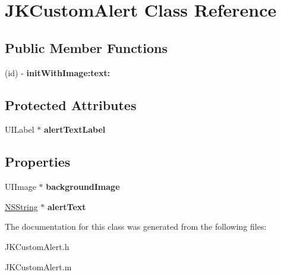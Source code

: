 \hypertarget{interface_j_k_custom_alert}{
\section{\-J\-K\-Custom\-Alert \-Class \-Reference}
\label{interface_j_k_custom_alert}
}
\subsection*{\-Public \-Member \-Functions}
\begin{DoxyCompactItemize}
\item 
\hypertarget{interface_j_k_custom_alert_a423fee7be575eb859c5f60d6b35910f8}{
(id) -\/ {\bfseries init\-With\-Image\-:text\-:}}
\label{interface_j_k_custom_alert_a423fee7be575eb859c5f60d6b35910f8}

\end{DoxyCompactItemize}
\subsection*{\-Protected \-Attributes}
\begin{DoxyCompactItemize}
\item 
\hypertarget{interface_j_k_custom_alert_abc171bdf8a320a5c17875d3e1f452adc}{
\-U\-I\-Label $\ast$ {\bfseries alert\-Text\-Label}}
\label{interface_j_k_custom_alert_abc171bdf8a320a5c17875d3e1f452adc}

\end{DoxyCompactItemize}
\subsection*{\-Properties}
\begin{DoxyCompactItemize}
\item 
\hypertarget{interface_j_k_custom_alert_a8ab53130edf421aa8f7e7e9a4fc0e93d}{
\-U\-I\-Image $\ast$ {\bfseries background\-Image}}
\label{interface_j_k_custom_alert_a8ab53130edf421aa8f7e7e9a4fc0e93d}

\item 
\hypertarget{interface_j_k_custom_alert_ab2184d6c5475d7ee9fa55b06c6dab54c}{
\hyperlink{class_n_s_string}{\-N\-S\-String} $\ast$ {\bfseries alert\-Text}}
\label{interface_j_k_custom_alert_ab2184d6c5475d7ee9fa55b06c6dab54c}

\end{DoxyCompactItemize}


\-The documentation for this class was generated from the following files\-:\begin{DoxyCompactItemize}
\item 
\-J\-K\-Custom\-Alert.\-h\item 
\-J\-K\-Custom\-Alert.\-m\end{DoxyCompactItemize}
